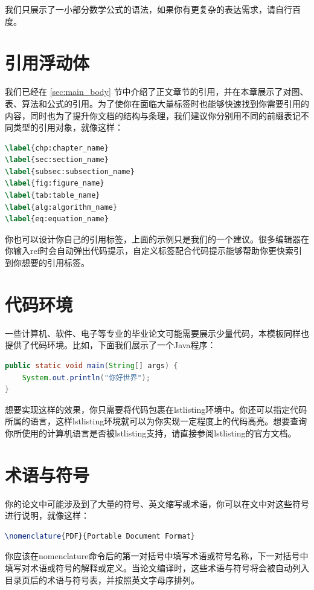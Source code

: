 我们只展示了一小部分数学公式的语法，如果你有更复杂的表达需求，请自行百度。

\section{引用浮动体}

我们已经在 \ref{sec:main_body} 节中介绍了正文章节的引用，并在本章展示了对图、表、算法和公式的引用。为了使你在面临大量标签时也能够快速找到你需要引用的内容，同时也为了提升你文档的结构与条理，我们建议你分别用不同的前缀表记不同类型的引用对象，就像这样：

\begin{tcolorbox}
\begin{lstlisting}[language=TeX]
\label{chp:chapter_name}
\label{sec:section_name}
\label{subsec:subsection_name}
\label{fig:figure_name}
\label{tab:table_name}
\label{alg:algorithm_name}
\label{eq:equation_name}
\end{lstlisting}
\end{tcolorbox}

\noindent 你也可以设计你自己的引用标签，上面的示例只是我们的一个建议。很多编辑器在你输入{\codefont ref}时会自动弹出代码提示，自定义标签配合代码提示能够帮助你更快索引到你想要的引用标签。

\section{代码环境}

一些计算机、软件、电子等专业的毕业论文可能需要展示少量代码，本模板同样也提供了代码环境。比如，下面我们展示了一个Java程序：

\begin{tcolorbox}
\begin{lstlisting}[language=Java]
public static void main(String[] args) {
    System.out.println("你好世界");
}
\end{lstlisting}
\end{tcolorbox}

想要实现这样的效果，你只需要将代码包裹在{\codefont lstlisting}环境中。你还可以指定代码所属的语言，这样{\codefont lstlisting}环境就可以为你实现一定程度上的代码高亮。想要查询你所使用的计算机语言是否被{\codefont lstlisting}支持，请直接参阅{\codefont lstlisting}的官方文档。

\section{术语与符号}

你的论文中可能涉及到了大量的符号、英文缩写或术语，你可以在文中对这些符号进行说明，就像这样：

\begin{tcolorbox}
\begin{lstlisting}[language=TeX]
\nomenclature{PDF}{Portable Document Format}
\end{lstlisting}
\end{tcolorbox}

\noindent 你应该在{\codefont nomenclature}命令后的第一对括号中填写术语或符号名称，下一对括号中填写对术语或符号的解释或定义。当论文编译时，这些术语与符号将会被自动列入目录页后的术语与符号表，并按照英文字母序排列。